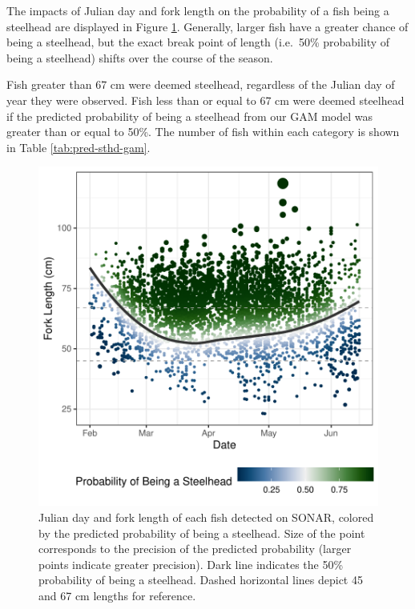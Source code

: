 \documentclass[
]{article}
\begin{document}
The impacts of Julian day and fork length on the probability of a fish being a steelhead are displayed in Figure \ref{fig:spp-pred}. Generally, larger fish have a greater chance of being a steelhead, but the exact break point of length (i.e.~50\% probability of being a steelhead) shifts over the course of the season.

Fish greater than 67 cm were deemed steelhead, regardless of the Julian day of year they were observed. Fish less than or equal to 67 cm were deemed steelhead if the predicted probability of being a steelhead from our GAM model was greater than or equal to 50\%. The number of fish within each category is shown in Table \ref{tab:pred-sthd-gam}.

\begin{figure}
\centering
\includegraphics{../figures/spp-pred-1.pdf}
\caption{\label{fig:spp-pred}Julian day and fork length of each fish detected on SONAR, colored by the predicted probability of being a steelhead. Size of the point corresponds to the precision of the predicted probability (larger points indicate greater precision). Dark line indicates the 50\% probability of being a steelhead. Dashed horizontal lines depict 45 and 67 cm lengths for reference.}
\end{figure}
\end{document}
